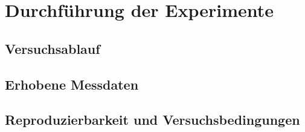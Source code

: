 
\chapter{Durchführung der Experimente}
\label{ch:durchfuehrung}

\section{Versuchsablauf}
\label{sec:versuchsablauf}

\section{Erhobene Messdaten}
\label{sec:messdaten}

\section{Reproduzierbarkeit und Versuchsbedingungen}
\label{sec:reproduzierbarkeit}
